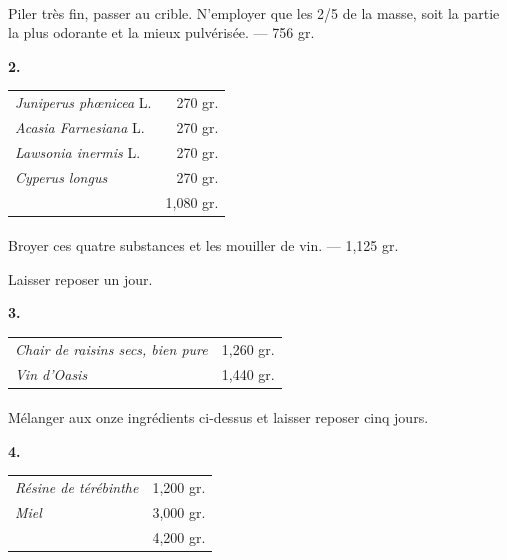 \documentclass[a4paper, 11pt, oneside, landscape]{article}
\begin{document}
\paragraph{}
Piler très fin, passer au crible. N'employer que les 2/5 de la masse, soit la partie la plus odorante et la mieux pulvérisée. --- 756 gr.
\begin{center}
\textbf{2.}
\end{center}
\begin{table}[H]
    \centering
    \begin{tabular}{l r}
        \emph{Juniperus phœnicea} L.  &  270 gr. \\
        \emph{Acasia Farnesiana} L.  &  270 gr. \\
        \emph{Lawsonia inermis} L.  &  270 gr. \\
        \emph{Cyperus longus}  &  270 gr. \\ \hline
        ~ & 1,080 gr. \\
    \end{tabular}
\end{table}
\paragraph{}
Broyer ces quatre substances et les mouiller de vin. --- 1,125 gr.

Laisser reposer un jour.
\begin{center}
\textbf{3.}
\end{center}
\begin{table}[H]
    \centering
    \begin{tabular}{l r}
        \emph{Chair de raisins secs, bien pure} & 1,260 gr. \\
        \emph{Vin d'Oasis} & 1,440 gr. \\
    \end{tabular}
\end{table}
\paragraph{}
Mélanger aux onze ingrédients ci-dessus et laisser reposer cinq jours.
\begin{center}
\textbf{4.}
\end{center}
\begin{table}[H]
    \centering
    \begin{tabular}{l r}
        \emph{Résine de térébinthe} & 1,200 gr. \\
        \emph{Miel} & 3,000 gr. \\ \hline
        ~ & 4,200 gr. \\
    \end{tabular}
\end{table}
\end{document}
